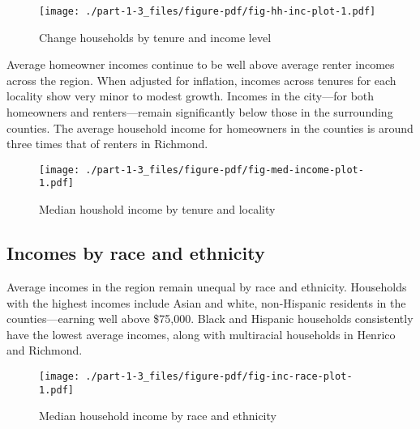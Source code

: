\documentclass[
  letterpaper,
  DIV=11,
  numbers=noendperiod]{scrreprt}
\begin{document}
\begin{figure}

{\centering \texttt{[image: ./part-1-3\_files/figure-pdf/fig-hh-inc-plot-1.pdf]}

}

\caption{\label{fig-hh-inc-plot}Change households by tenure and income
level}

\end{figure}

Average homeowner incomes continue to be well above average renter
incomes across the region. When adjusted for inflation, incomes across
tenures for each locality show very minor to modest growth. Incomes in
the city---for both homeowners and renters---remain significantly below
those in the surrounding counties. The average household income for
homeowners in the counties is around three times that of renters in
Richmond.

\begin{figure}

{\centering \texttt{[image: ./part-1-3\_files/figure-pdf/fig-med-income-plot-1.pdf]}

}

\caption{\label{fig-med-income-plot}Median houshold income by tenure and
locality}

\end{figure}

\hypertarget{incomes-by-race-and-ethnicity}{%
\subsection{Incomes by race and
ethnicity}\label{incomes-by-race-and-ethnicity}}

Average incomes in the region remain unequal by race and ethnicity.
Households with the highest incomes include Asian and white,
non-Hispanic residents in the counties---earning well above \$75,000.
Black and Hispanic households consistently have the lowest average
incomes, along with multiracial households in Henrico and Richmond.

\begin{figure}

{\centering \texttt{[image: ./part-1-3\_files/figure-pdf/fig-inc-race-plot-1.pdf]}

}

\caption{\label{fig-inc-race-plot}Median household income by race and
ethnicity}

\end{figure}
\end{document}
